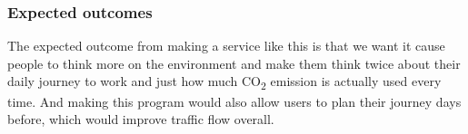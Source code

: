 \subsubsection{Expected outcomes}

The expected outcome from making a service like this is that we want it cause people to think more on the environment
and make them think twice about their daily journey to work and just how much \unit{CO_{2}} emission is actually used
every time.
And making this program would also allow users to plan their journey days before, which would improve traffic flow
overall.
